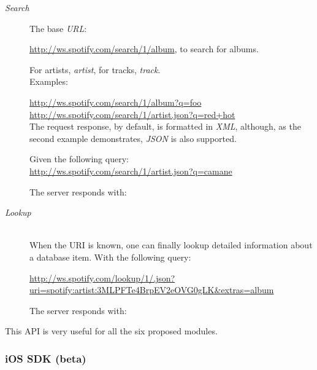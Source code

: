         \begin{description}
          \item[\emph{Search}] \hfill

            The base \emph{URL}:

            \url{http://ws.spotify.com/search/1/album}, to search for albums.

            For artists, \emph{artist}, for tracks, \emph{track}. \\

            Examples:

            \url{http://ws.spotify.com/search/1/album?q=foo} \\
            \url{http://ws.spotify.com/search/1/artist.json?q=red+hot} \\

            The request response, by default, is formatted in \emph{XML}, although, as the second example demonstrates, \emph{JSON} is also supported.

            Given the following query: \\
            \url{http://ws.spotify.com/search/1/artist.json?q=camane}

            The server responds with:

            

          \item[\emph{Lookup}] \hfill \\

            When the URI is known, one can finally lookup detailed information about a database item. With the following query:

            \sloppy
            \url{http://ws.spotify.com/lookup/1/.json?uri=spotify:artist:3MLPFTe4BrpEV2eOVG0gLK&extras=album}

            The server responds with:

            

        \end{description}

        This API is very useful for all the six proposed modules.


      \subsubsection{iOS SDK (beta)} %
      \label{ssub:ios_sdk}
      
